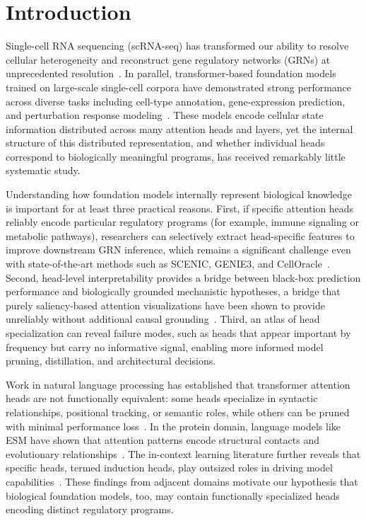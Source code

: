 \documentclass[11pt]{article}
\begin{document}
\section{Introduction}

Single-cell RNA sequencing (scRNA-seq) has transformed our ability to resolve cellular heterogeneity and reconstruct gene regulatory networks (GRNs) at unprecedented resolution~\cite{stuart2019seurat,wolf2018scanpy}. In parallel, transformer-based foundation models trained on large-scale single-cell corpora have demonstrated strong performance across diverse tasks including cell-type annotation, gene-expression prediction, and perturbation response modeling~\cite{cui2024scgpt,theodoris2023geneformer,yang2022scbert,hao2024scfoundation}. These models encode cellular state information distributed across many attention heads and layers, yet the internal structure of this distributed representation, and whether individual heads correspond to biologically meaningful programs, has received remarkably little systematic study.

Understanding how foundation models internally represent biological knowledge is important for at least three practical reasons. First, if specific attention heads reliably encode particular regulatory programs (for example, immune signaling or metabolic pathways), researchers can selectively extract head-specific features to improve downstream GRN inference, which remains a significant challenge even with state-of-the-art methods such as SCENIC, GENIE3, and CellOracle~\cite{aibar2017scenic,huynh2010genie3,kamimoto2023celloracle,pratapa2020beeline}. Second, head-level interpretability provides a bridge between black-box prediction performance and biologically grounded mechanistic hypotheses, a bridge that purely saliency-based attention visualizations have been shown to provide unreliably without additional causal grounding~\cite{jain2019attention,adebayo2018sanity}. Third, an atlas of head specialization can reveal failure modes, such as heads that appear important by frequency but carry no informative signal, enabling more informed model pruning, distillation, and architectural decisions.

Work in natural language processing has established that transformer attention heads are not functionally equivalent: some heads specialize in syntactic relationships, positional tracking, or semantic roles, while others can be pruned with minimal performance loss~\cite{voita2019heads,michel2019sixteen,clark2019bert}. In the protein domain, language models like ESM have shown that attention patterns encode structural contacts and evolutionary relationships~\cite{rives2021esm}. The in-context learning literature further reveals that specific heads, termed induction heads, play outsized roles in driving model capabilities~\cite{olsson2022induction}. These findings from adjacent domains motivate our hypothesis that biological foundation models, too, may contain functionally specialized heads encoding distinct regulatory programs.
\end{document}
